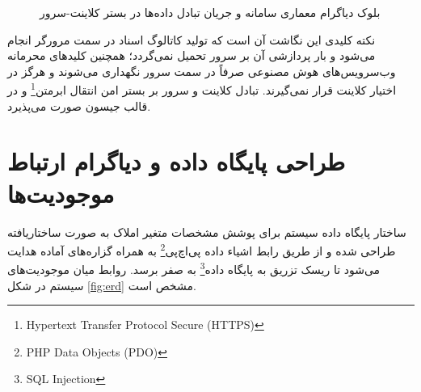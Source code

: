 \documentclass[11pt, a4paper]{report}
\newcommand{\enfootnote}[1]{\footnote{\foreignlanguage{english}{#1}}}
\begin{document}
\begin{figure}[htbp]
  \caption{بلوک دیاگرام معماری سامانه و جریان تبادل داده‌ها در بستر کلاینت-سرور}
  \label{fig:architecture}
\end{figure}

نکته کلیدی این نگاشت آن است که تولید کاتالوگ اسناد در سمت مرورگر انجام می‌شود و بار پردازشی آن بر سرور تحمیل نمی‌گردد؛ همچنین کلیدهای محرمانه وب‌سرویس‌های هوش مصنوعی صرفاً در سمت سرور نگهداری می‌شوند و هرگز در اختیار کلاینت قرار نمی‌گیرند. تبادل کلاینت و سرور بر بستر امن انتقال ابرمتن\enfootnote{Hypertext Transfer Protocol Secure (HTTPS)} و در قالب جیسون صورت می‌پذیرد.

\section{طراحی پایگاه داده و دیاگرام ارتباط موجودیت‌ها}
ساختار پایگاه داده سیستم برای پوشش مشخصات متغیر املاک به صورت ساختاریافته طراحی شده و از طریق رابط اشیاء داده پی‌اچ‌پی\enfootnote{PHP Data Objects (PDO)} به همراه گزاره‌های آماده هدایت می‌شود تا ریسک تزریق به پایگاه داده\enfootnote{SQL Injection} به صفر برسد. روابط میان موجودیت‌های سیستم در شکل \ref{fig:erd} مشخص است.
\end{document}
